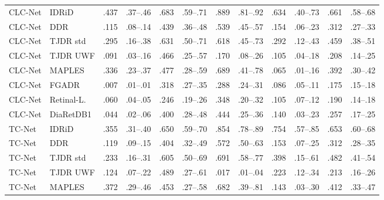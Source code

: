 \begin{landscape}
{\begin{longtable}{l l c c c c c c c c c c}
CLC-Net & IDRiD & .437 & \scriptsize .37--.46 & .683 & \scriptsize .59--.71 & .889 & \scriptsize .81--.92 & .634 & \scriptsize .40--.73 & .661 & \scriptsize .58--.68 \\
CLC-Net & DDR & .115 & \scriptsize .08--.14 & .439 & \scriptsize .36--.48 & .539 & \scriptsize .45--.57 & .154 & \scriptsize .06--.23 & .312 & \scriptsize .27--.33 \\
CLC-Net & TJDR std & .295 & \scriptsize .16--.38 & .631 & \scriptsize .50--.71 & .618 & \scriptsize .45--.73 & .292 & \scriptsize .12--.43 & .459 & \scriptsize .38--.51 \\
CLC-Net & TJDR UWF & .091 & \scriptsize .03--.16 & .466 & \scriptsize .25--.57 & .170 & \scriptsize .08--.26 & .105 & \scriptsize .04--.18 & .208 & \scriptsize .14--.25 \\
CLC-Net & MAPLES & .336 & \scriptsize .23--.37 & .477 & \scriptsize .28--.59 & .689 & \scriptsize .41--.78 & .065 & \scriptsize .01--.16 & .392 & \scriptsize .30--.42 \\
CLC-Net & FGADR & .007 & \scriptsize .01--.01 & .318 & \scriptsize .27--.35 & .288 & \scriptsize .24--.31 & .086 & \scriptsize .05--.11 & .175 & \scriptsize .15--.18 \\
CLC-Net & Retinal-L. & .060 & \scriptsize .04--.05 & .246 & \scriptsize .19--.26 & .348 & \scriptsize .20--.32 & .105 & \scriptsize .07--.12 & .190 & \scriptsize .14--.18 \\
CLC-Net & DiaRetDB1 & .044 & \scriptsize .02--.06 & .400 & \scriptsize .28--.48 & .444 & \scriptsize .25--.36 & .140 & \scriptsize .03--.23 & .257 & \scriptsize .17--.25 \\
TC-Net & IDRiD & .355 & \scriptsize .31--.40 & .650 & \scriptsize .59--.70 & .854 & \scriptsize .78--.89 & .754 & \scriptsize .57--.85 & .653 & \scriptsize .60--.68 \\
TC-Net & DDR & .119 & \scriptsize .09--.15 & .404 & \scriptsize .32--.49 & .572 & \scriptsize .50--.63 & .153 & \scriptsize .07--.25 & .312 & \scriptsize .28--.35 \\
TC-Net & TJDR std & .233 & \scriptsize .16--.31 & .605 & \scriptsize .50--.69 & .691 & \scriptsize .58--.77 & .398 & \scriptsize .15--.61 & .482 & \scriptsize .41--.54 \\
TC-Net & TJDR UWF & .124 & \scriptsize .07--.22 & .489 & \scriptsize .27--.61 & .017 & \scriptsize .01--.04 & .223 & \scriptsize .12--.34 & .213 & \scriptsize .16--.26 \\
TC-Net & MAPLES & .372 & \scriptsize .29--.46 & .453 & \scriptsize .27--.58 & .682 & \scriptsize .39--.81 & .143 & \scriptsize .03--.30 & .412 & \scriptsize .33--.47 \\

\end{longtable}}
\end{landscape}
